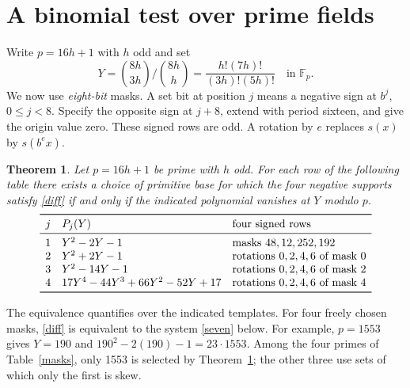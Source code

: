 \documentclass[11pt]{article}
\newtheorem{theorem}{Theorem}
\newcommand{\F}{\mathbb F}
\begin{document}
\section{A binomial test over prime fields}
Write $p=16h+1$ with $h$ odd and set
\[
 Y=\binom{8h}{3h}\big/\binom{8h}{h}
   =\frac{h!(7h)!}{(3h)!(5h)!}\quad\text{in }\F_p.
\]
We now use \emph{eight-bit} masks. A set bit at position $j$ means a negative sign at $b^j$, $0\le j<8$. Specify the opposite sign at $j+8$, extend with period sixteen, and give the origin value zero. These signed rows are odd. A rotation by $e$ replaces $s(x)$ by $s(b^e x)$.
\begin{theorem}\label{ratio}
Let $p=16h+1$ be prime with $h$ odd. For each row of the following table there exists a choice of primitive base for which the four negative supports satisfy \eqref{diff} if and only if the indicated polynomial vanishes at $Y$ modulo $p$.
\[
\begin{array}{cll}
\toprule j& P_j(Y)&\text{four signed rows}\\
\midrule
1&Y^2-2Y-1&\text{masks }48,12,252,192\\
2&Y^2+2Y-1&\text{rotations }0,2,4,6\text{ of mask }0\\
3&Y^2-14Y-1&\text{rotations }0,2,4,6\text{ of mask }2\\
4&17Y^4-44Y^3+66Y^2-52Y+17&\text{rotations }0,2,4,6\text{ of mask }4\\
\bottomrule
\end{array}
\]
\end{theorem}
The equivalence quantifies over the indicated templates. For four freely chosen masks, \eqref{diff} is equivalent to the system \eqref{seven} below. For example, $p=1553$ gives $Y=190$ and $190^2-2(190)-1=23\cdot1553$. Among the four primes of Table~\ref{masks}, only 1553 is selected by Theorem~\ref{ratio}; the other three use sets of which only the first is skew.
\end{document}
